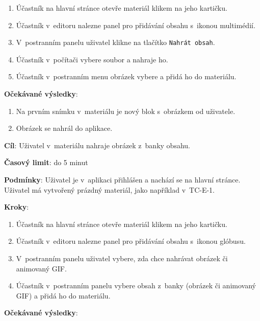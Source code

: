 \begin{enumerate}[leftmargin=1.4cm]
    \item Účastník na hlavní stránce otevře materiál klikem na jeho kartičku.
    \item Účastník v~editoru nalezne panel pro přidávání obsahu s~ikonou multimédií.
    \item V~postranním panelu uživatel klikne na tlačítko \verb|Nahrát obsah|.
    \item Účastník v~počítači vybere soubor a nahraje ho.
    \item Účastník v~postranním menu obrázek vybere a přidá ho do materiálu.
\end{enumerate}

\textbf{Očekávané výsledky}:

\begin{enumerate}[leftmargin=1.4cm]
    \item Na prvním snímku v~materiálu je nový blok s~obrázkem od uživatele.
    \item Obrázek se nahrál do aplikace.
\end{enumerate}






\vspace{1em}

\textbf{Cíl}: Uživatel v~materiálu nahraje obrázek z~banky obsahu.

\textbf{Časový limit}: do 5 minut

\textbf{Podmínky}:  Uživatel je v~aplikaci přihlášen a nachází se na hlavní stránce. Uživatel má vytvořený prázdný materiál, jako například v~TC-E-1.

\textbf{Kroky}:

\begin{enumerate}[leftmargin=1.4cm]
    \item Účastník na hlavní stránce otevře materiál klikem na jeho kartičku.
    \item Účastník v~editoru nalezne panel pro přidávání obsahu s~ikonou glóbusu.
    \item V~postranním panelu uživatel vybere, zda chce nahrávat obrázek či animovaný GIF.
    \item Účastník v~postranním panelu vybere obsah z~banky (obrázek či animovaný GIF) a přidá ho do materiálu.
\end{enumerate}

\textbf{Očekávané výsledky}:

